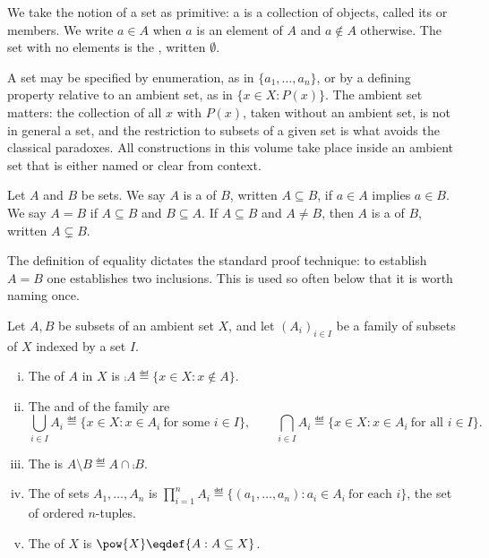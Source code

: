 We take the notion of a set as primitive: a  is a collection of objects,
called its  or members. We write $a\in A$ when $a$ is an
element of $A$ and $a\notin A$ otherwise. The set with no elements is the
, written $\emptyset$.

A set may be specified by enumeration, as in $\{a_1,\dots,a_n\}$, or by a
defining property relative to an ambient set, as in
$\{x\in X : P(x)\}$. The ambient set matters: the collection of all $x$ with
$P(x)$, taken without an ambient set, is not in general a set, and the
restriction to subsets of a given set is what avoids the classical paradoxes. All
constructions in this volume take place inside an ambient set that is either
named or clear from context.

\begin{definition}\label{def:inclusion}
	Let $A$ and $B$ be sets. We say $A$ is a  of $B$, written
	$A\subseteq B$, if $a\in A$ implies $a\in B$. We say $A=B$ if $A\subseteq B$ and
	$B\subseteq A$. If $A\subseteq B$ and $A\neq B$, then $A$ is a  of $B$, written $A\subsetneq B$.
\end{definition}

The definition of equality dictates the standard proof technique: to establish
$A=B$ one establishes two inclusions. This is used so often below that it is
worth naming once.

\begin{definition}\label{def:set-ops}
	Let $A,B$ be subsets of an ambient set $X$, and let $(A_i)_{i\in I}$ be a family
	of subsets of $X$ indexed by a set $I$.
	\begin{enumerate}[(i)]
		\item The  of $A$ in $X$ is
		      $\comp{A}\eqdef\{x\in X : x\notin A\}$.
		\item The  and  of the family are
		      \[
			      \bigcup_{i\in I}A_i\eqdef\{x\in X : x\in A_i\ \text{for some }i\in I\},
			      \qquad
			      \bigcap_{i\in I}A_i\eqdef\{x\in X : x\in A_i\ \text{for all }i\in I\}.
		      \]
		\item The  is $A\setminus B\eqdef A\cap\comp{B}$.
		\item The  of sets $A_1,\dots,A_n$ is
		      $\prod_{i=1}^n A_i\eqdef\{(a_1,\dots,a_n) : a_i\in A_i\ \text{for each }i\}$,
		      the set of ordered $n$-tuples.
		\item The  of $X$ is $\pow{X}\eqdef\{A : A\subseteq X\}$.
	\end{enumerate}
\end{definition}

